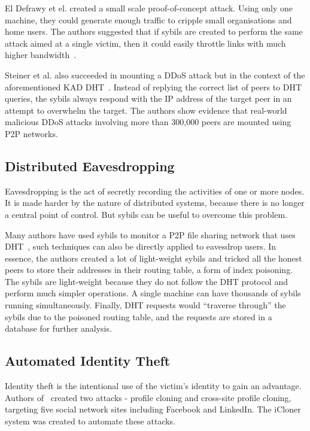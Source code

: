 El Defrawy et el. created a small scale proof-of-concept attack.
Using only one machine, they could generate enough traffic to cripple small
organisations and home users. The authors suggested that if sybils are created
to perform the same attack aimed at a single victim, then it could easily
throttle links with much higher bandwidth~\cite{el2007bottorrent}.

Steiner et al. also succeeded in mounting a DDoS attack but in the context of
the aforementioned KAD DHT~\cite{steiner2007exploiting}. Instead of replying the
correct list of peers to DHT queries, the sybils always respond with the IP
address of the target peer in an attempt to overwhelm the target. The authors
show evidence that real-world malicious DDoS attacks involving more than 300,000
peers are mounted using P2P networks.

\subsection{Distributed Eavesdropping}
Eavesdropping is the act of secretly recording the activities of one or more
nodes. It is made harder by the nature of distributed systems, because there is
no longer a central point of control. But sybils can be useful to overcome this
problem.

Many authors have used sybils to monitor a P2P file sharing network that uses
DHT~\cite{holz2008measurements, steiner2007exploiting}, such techniques can also
be directly applied to eavesdrop users. In essence, the authors created a lot of
light-weight sybils and tricked all the honest peers to store their addresses in
their routing table, a form of index poisoning. The sybils are light-weight
because they do not follow the DHT protocol and perform much simpler operations.
A single machine can have thousands of sybils running simultaneously. Finally,
DHT requests would ``traverse through'' the sybils due to the poisoned routing
table, and the requests are stored in a database for further analysis.

\subsection{Automated Identity Theft}
Identity theft is the intentional use of the victim's identity to gain an
advantage. Authors of~\cite{bilge2009all} created two attacks - profile cloning
and cross-site profile cloning, targeting five social network sites including
Facebook and LinkedIn. The iCloner system was created to automate these attacks.

